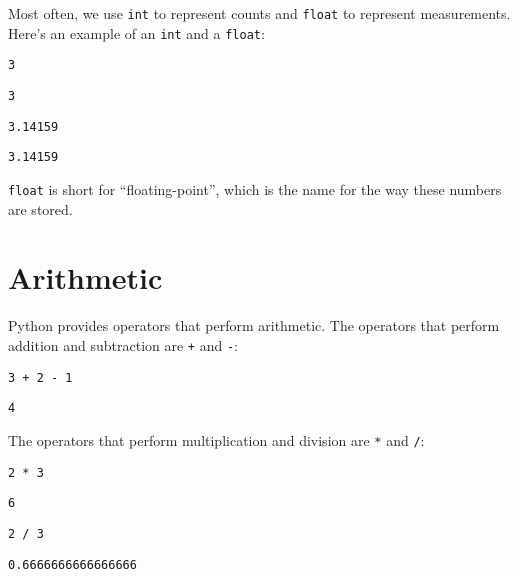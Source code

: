 Most often, we use \passthrough{\lstinline!int!} to represent counts and
\passthrough{\lstinline!float!} to represent measurements. Here's an
example of an \passthrough{\lstinline!int!} and a
\passthrough{\lstinline!float!}:

\begin{lstlisting}[]
3
\end{lstlisting}

\begin{lstlisting}[style=output]
3
\end{lstlisting}

\begin{lstlisting}[]
3.14159
\end{lstlisting}

\begin{lstlisting}[style=output]
3.14159
\end{lstlisting}

\passthrough{\lstinline!float!} is short for ``floating-point'', which
is the name for the way these numbers are stored.

\hypertarget{arithmetic}{%
\section{Arithmetic}\label{arithmetic}}

Python provides operators that perform arithmetic. The operators that
perform addition and subtraction are \passthrough{\lstinline!+!} and
\passthrough{\lstinline!-!}:

\begin{lstlisting}[]
3 + 2 - 1
\end{lstlisting}

\begin{lstlisting}[style=output]
4
\end{lstlisting}

The operators that perform multiplication and division are
\passthrough{\lstinline!*!} and \passthrough{\lstinline!/!}:

\begin{lstlisting}[]
2 * 3
\end{lstlisting}

\begin{lstlisting}[style=output]
6
\end{lstlisting}

\begin{lstlisting}[]
2 / 3
\end{lstlisting}

\begin{lstlisting}[style=output]
0.6666666666666666
\end{lstlisting}

